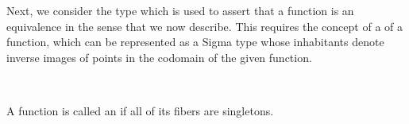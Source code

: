 \ccpad
Next, we consider the type  which is used to assert that a function is an equivalence in the sense that we now describe. This requires the concept of a \href{https://ncatlab.org/nlab/show/fiber}{} of a function, which can be represented as a Sigma type whose inhabitants denote inverse images of points in the codomain of the given function.
\ccpad
\begin{code}%
\>[1]\AgdaSpace{}%
\AgdaSymbol{:}\AgdaSpace{}%
\AgdaSymbol{\{}\AgdaSpace{}%
\AgdaSymbol{:}\AgdaSpace{}%
\AgdaSpace{}%
%
\AgdaSymbol{\}}\AgdaSpace{}%
\AgdaSymbol{\{}\AgdaSpace{}%
\AgdaSymbol{:}\AgdaSpace{}%
\AgdaSpace{}%
%
\AgdaSymbol{\}}\AgdaSpace{}%
\AgdaSymbol{(}\AgdaSpace{}%
\AgdaSymbol{:}\AgdaSpace{}%
\AgdaSpace{}%
\AgdaSpace{}%
\AgdaSymbol{)}\AgdaSpace{}%
\AgdaSpace{}%
\AgdaSpace{}%
\AgdaSpace{}%
\AgdaSpace{}%
\AgdaSpace{}%
\AgdaSpace{}%
\<%
\\
%
\>[1]\AgdaSpace{}%
\AgdaSymbol{\{}\AgdaSymbol{\}}\AgdaSpace{}%
\AgdaSpace{}%
\AgdaSpace{}%
\AgdaSymbol{=}\AgdaSpace{}%
\AgdaSpace{}%
\AgdaSpace{}%
\AgdaSpace{}%
\AgdaSpace{}%
\AgdaFunction{,}\AgdaSpace{}%
\AgdaSpace{}%
\AgdaSpace{}%
\AgdaSpace{}%
\<%
\end{code}
\ccpad
A function is called an  if all of its fibers are singletons.
\ccpad
\begin{code}%
\>[1]\AgdaSpace{}%
\AgdaSymbol{:}\AgdaSpace{}%
\AgdaSymbol{\{}\AgdaSpace{}%
\AgdaSymbol{:}\AgdaSpace{}%
\AgdaSpace{}%
%
\AgdaSymbol{\}}\AgdaSpace{}%
\AgdaSymbol{\{}\AgdaSpace{}%
\AgdaSymbol{:}\AgdaSpace{}%
\AgdaSpace{}%
%
\AgdaSymbol{\}}\AgdaSpace{}%
\AgdaSpace{}%
\AgdaSymbol{(}\AgdaSpace{}%
\AgdaSpace{}%
\AgdaSymbol{)}\AgdaSpace{}%
\AgdaSpace{}%
\AgdaSpace{}%
\AgdaSpace{}%
\AgdaSpace{}%
\<%
\\
%
\>[1]\AgdaSpace{}%
\AgdaSpace{}%
\AgdaSymbol{=}\AgdaSpace{}%
\AgdaSpace{}%
\AgdaSpace{}%
\AgdaSpace{}%
\AgdaSpace{}%
\AgdaSymbol{(}\AgdaSpace{}%
\AgdaSpace{}%
\AgdaSymbol{)}\<%
\end{code}
